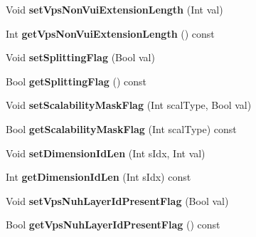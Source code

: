 \begin{DoxyCompactItemize}
\item 
\mbox{\label{class_t_com_v_p_s_a431b3073a275ddaf94657dce383853ab}} 
Void {\bfseries set\+Vps\+Non\+Vui\+Extension\+Length} (Int val)
\item 
\mbox{\label{class_t_com_v_p_s_a150e94422cde3bb91895200ec1159b6a}} 
Int {\bfseries get\+Vps\+Non\+Vui\+Extension\+Length} () const
\item 
\mbox{\label{class_t_com_v_p_s_a7a03a3da1899323036bc1e9c901f40d7}} 
Void {\bfseries set\+Splitting\+Flag} (Bool val)
\item 
\mbox{\label{class_t_com_v_p_s_a4839a9dd94465afe6ff6b6e3af5697aa}} 
Bool {\bfseries get\+Splitting\+Flag} () const
\item 
\mbox{\label{class_t_com_v_p_s_a1b76439a5a3e9c10eaf161766774dab8}} 
Void {\bfseries set\+Scalability\+Mask\+Flag} (Int scal\+Type, Bool val)
\item 
\mbox{\label{class_t_com_v_p_s_af93d305f642c32762da0330bba5ead5e}} 
Bool {\bfseries get\+Scalability\+Mask\+Flag} (Int scal\+Type) const
\item 
\mbox{\label{class_t_com_v_p_s_ac957bdfdc209e10f8d92631301801599}} 
Void {\bfseries set\+Dimension\+Id\+Len} (Int s\+Idx, Int val)
\item 
\mbox{\label{class_t_com_v_p_s_ab82bc20498a7b0229f15802aa28bad89}} 
Int {\bfseries get\+Dimension\+Id\+Len} (Int s\+Idx) const
\item 
\mbox{\label{class_t_com_v_p_s_a6cc6cd3ec81032d5987afd08732b8960}} 
Void {\bfseries set\+Vps\+Nuh\+Layer\+Id\+Present\+Flag} (Bool val)
\item 
\mbox{\label{class_t_com_v_p_s_a69525f6e464bb60672708bbda9adb978}} 
Bool {\bfseries get\+Vps\+Nuh\+Layer\+Id\+Present\+Flag} () const
\item 
\mbox{\label{class_t_com_v_p_s_ac5d8ffccd923908cd9c2fcc31f01dcd0}} 

\end{DoxyCompactItemize}
